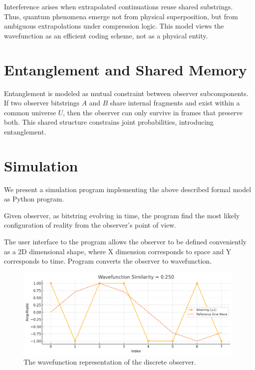 \documentclass[12pt]{article}
\begin{document}
Interference arises when extrapolated continuations reuse shared substrings. Thus, quantum phenomena emerge not from physical superposition, but from ambiguous extrapolations under compression logic. This model views the wavefunction as an efficient coding scheme, not as a physical entity.

\section{Entanglement and Shared Memory}

Entanglement is modeled as mutual constraint between observer subcomponents. If two observer bitstrings $A$ and $B$ share internal fragments and exist within a common universe $U$, then the observer can only survive in frames that preserve both. This shared structure constrains joint probabilities, introducing entanglement.


\section{Simulation}

We present a simulation program implementing the above described formal model as Python program.

Given observer, as bitstring evolving in time, the program find the most likely configuration of
reality from the observer's point of view.

The user interface to the program allows the observer to be defined conveniently as a
2D dimensional shape, where X dimension corresponds to space and Y corresponds to time.
Program converts the observer to wavefunction.

\begin{figure}[h!]
    \centering
    \includegraphics[width=1.0\textwidth]{figures/wavefunction_similarity.png}
    \caption{The wavefunction representation of the discrete observer.}
    \label{fig:wavefunction_similarity}
\end{figure}
\end{document}
